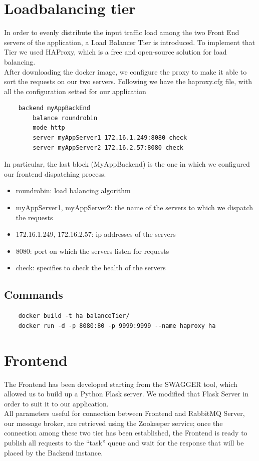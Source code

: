 \documentclass{article}
\begin{document}
\section{Loadbalancing tier}
In order to evenly distribute the input traffic load among the two Front End servers of the application, a Load Balancer Tier is introduced. To implement that Tier we used HAProxy, which is a free and open-source solution for load balancing. \\
After downloading the docker image, we configure the proxy to make it able to sort the requests on our two servers. Following we have the haproxy.cfg file, with all the configuration setted for our application
\begin{verbatim}
    backend myAppBackEnd
        balance roundrobin
        mode http
        server myAppServer1 172.16.1.249:8080 check
        server myAppServer2 172.16.2.57:8080 check
\end{verbatim}
\vspace{3mm}
In particular, the last block (MyAppBackend) is the one in which we configured our frontend dispatching process. 
\begin{itemize}
\item roundrobin: load balancing algorithm
\item myAppServer1, myAppServer2: the name of the servers to which we dispatch the requests
\item 172.16.1.249, 172.16.2.57: ip addresses of the servers
\item 8080: port on which the servers listen for requests
\item check: specifies to check the health of the servers
\end{itemize}
\subsection{Commands}  
\begin{verbatim}
    docker build -t ha balanceTier/
    docker run -d -p 8080:80 -p 9999:9999 --name haproxy ha
\end{verbatim}




\section{Frontend}
The Frontend has been developed starting from the SWAGGER tool, which allowed us to build up a Python Flask server. We modified that Flask Server in order to suit it to our application.\\
All parameters useful for connection between Frontend and RabbitMQ Server, our message broker, are retrieved using the Zookeeper service; once the connection among these two tier has been established, the Frontend is ready to publish all requests to the “task” queue and wait for the response that will be placed by the Backend instance. 
\end{document}
